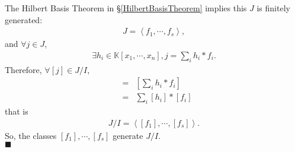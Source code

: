 \documentclass[11pt]{book}
\begin{document}
The Hilbert Basis Theorem in \S\ref{HilbertBasisTheorem} implies this $J$ is finitely generated:
\begin{eqnarray}
J = \left< f_1, \cdots, f_s \right>,
\end{eqnarray}
and $\forall j \in J$,
\begin{eqnarray}
\exists h_i \in \mathbb{K}[x_1, \cdots, x_n], j = \sum_i h_i * f_i.
\end{eqnarray}
Therefore, $\forall [j] \in J/I$,
\begin{eqnarray}
[j] &=& \left[ \sum_i h_i * f_i \right] \\
&=& \sum_i [h_i] * [f_i]
\end{eqnarray}
that is
\begin{eqnarray}
J/I = \left< [f_1], \cdots, [f_s] \right>.
\end{eqnarray}
So, the classes $[f_1], \cdots, [f_s]$ generate $J/I$.\\
$\blacksquare$
\end{document}
